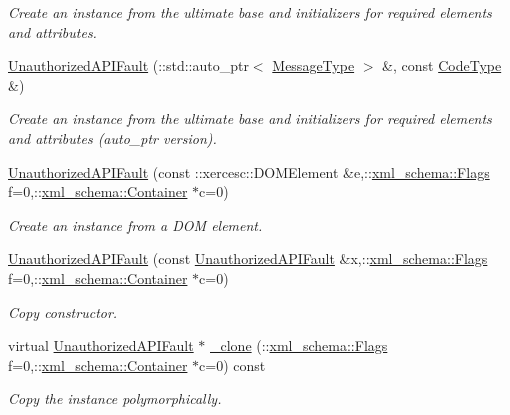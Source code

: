 \begin{DoxyCompactItemize}
\begin{DoxyCompactList}\small\item\em Create an instance from the ultimate base and initializers for required elements and attributes. \item\end{DoxyCompactList}\item 
\hyperlink{classopenstack_1_1xml_1_1UnauthorizedAPIFault_ac96edd0a86ae283631a3ec87370f6028}{UnauthorizedAPIFault} (::std::auto\_\-ptr$<$ \hyperlink{classopenstack_1_1xml_1_1CloudServersAPIFault_aff7b9d2067747fa033a0ea4408011af6}{MessageType} $>$ \&, const \hyperlink{classopenstack_1_1xml_1_1CloudServersAPIFault_aa9f350c9dba08ae375b2a61568551550}{CodeType} \&)
\begin{DoxyCompactList}\small\item\em Create an instance from the ultimate base and initializers for required elements and attributes (auto\_\-ptr version). \item\end{DoxyCompactList}\item 
\hyperlink{classopenstack_1_1xml_1_1UnauthorizedAPIFault_ac7a1c1f234a5371421ee7effd8261ca4}{UnauthorizedAPIFault} (const ::xercesc::DOMElement \&e,::\hyperlink{namespacexml__schema_affb4c227cbd9aa7453dd1dc5a1401943}{xml\_\-schema::Flags} f=0,::\hyperlink{namespacexml__schema_a333dea2213742aea47a37532dec4ec27}{xml\_\-schema::Container} $\ast$c=0)
\begin{DoxyCompactList}\small\item\em Create an instance from a DOM element. \item\end{DoxyCompactList}\item 
\hyperlink{classopenstack_1_1xml_1_1UnauthorizedAPIFault_ae2abb62fc9c7ebcd0ca0018830be99f1}{UnauthorizedAPIFault} (const \hyperlink{classopenstack_1_1xml_1_1UnauthorizedAPIFault}{UnauthorizedAPIFault} \&x,::\hyperlink{namespacexml__schema_affb4c227cbd9aa7453dd1dc5a1401943}{xml\_\-schema::Flags} f=0,::\hyperlink{namespacexml__schema_a333dea2213742aea47a37532dec4ec27}{xml\_\-schema::Container} $\ast$c=0)
\begin{DoxyCompactList}\small\item\em Copy constructor. \item\end{DoxyCompactList}\item 
virtual \hyperlink{classopenstack_1_1xml_1_1UnauthorizedAPIFault}{UnauthorizedAPIFault} $\ast$ \hyperlink{classopenstack_1_1xml_1_1UnauthorizedAPIFault_a272251fb55edd92b657b0703cf481791}{\_\-clone} (::\hyperlink{namespacexml__schema_affb4c227cbd9aa7453dd1dc5a1401943}{xml\_\-schema::Flags} f=0,::\hyperlink{namespacexml__schema_a333dea2213742aea47a37532dec4ec27}{xml\_\-schema::Container} $\ast$c=0) const 
\begin{DoxyCompactList}\small\item\em Copy the instance polymorphically. \item\end{DoxyCompactList}\end{DoxyCompactItemize}


